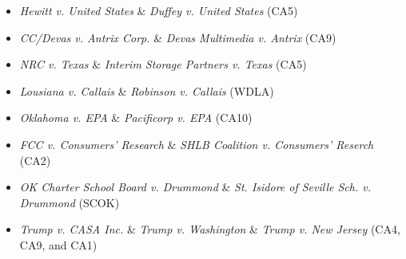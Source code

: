 \begin{itemize}

\item \emph{Hewitt v. United States} \& \emph{Duffey v. United States} (CA5)
\item \emph{CC/Devas v. Antrix Corp.} \& \emph{Devas Multimedia v. Antrix} (CA9)
\item \emph{NRC v. Texas} \& \emph{Interim Storage Partners v. Texas} (CA5)
\item \emph{Lousiana v. Callais} \& \emph{Robinson v. Callais} (WDLA)
\item \emph{Oklahoma v. EPA} \& \emph{Pacificorp v. EPA} (CA10)
\item \emph{FCC v. Consumers' Research} \& \emph{SHLB Coalition v. Consumers' Reserch} (CA2)
\item \emph{OK Charter School Board v. Drummond} \& \emph{St. Isidore of Seville Sch. v. Drummond} (SCOK)
\item \emph{Trump v. CASA Inc.} \& \emph{Trump v. Washington} \& \emph{Trump v. New Jersey} (CA4, CA9, and CA1)

\end{itemize}
